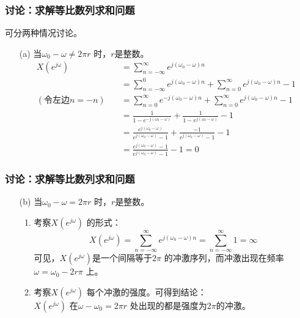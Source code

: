\documentclass[notheorems,compress,mathserif,table]{beamer}
\begin{document}
\begin{frame}[shrink]\frametitle{讨论：求解等比数列求和问题}%
可分两种情况讨论。
\begin{enumerate}

\item [(a)] 当$\omega_{0}-\omega\neq 2\pi r$ 时，$r$是整数。
\begin{equation*}
\begin{split}
X(e^{j\omega})
&= \sum_{n=-\infty}^{\infty}e^{j(\omega_{0}-\omega) n}\\
&= \sum_{n=-\infty}^{0}e^{j(\omega_{0}-\omega) n}+
\sum_{n=0}^{\infty}e^{j(\omega_{0}-\omega) n} -1\\
(\mbox{令左边}n=-n)\quad  &= \sum_{n=0}^{\infty}e^{-j(\omega_{0}-\omega) n}+
\sum_{n=0}^{\infty}e^{j(\omega_{0}-\omega) n} -1\\
&= \frac{1}{1-e^{-j(\omega_{0}-\omega) }}+ \frac{1}{1-e^{j(\omega_{0}-\omega) }}-1\\
&= \frac{e^{j(\omega_{0}-\omega) }}{e^{j(\omega_{0}-\omega) }-1}+
\frac{-1}{e^{j(\omega_{0}-\omega) }-1}-1\\
&= \frac{e^{j(\omega_{0}-\omega) }-1}{e^{j(\omega_{0}-\omega) }-1}-1 = 0
\end{split}
\end{equation*}
\end{enumerate}
\end{frame}





\begin{frame}[shrink]\frametitle{讨论：求解等比数列求和问题}%
\begin{enumerate}
\item [(b)] 当$\omega_{0}-\omega= 2\pi r$ 时，$r$是整数。

\begin{enumerate}
\item 考察$X(e^{j\omega})$ 的形式：
$$X(e^{j\omega})= \sum_{n=-\infty}^{\infty}e^{j(\omega_{0}-\omega) n}= \sum_{n=-\infty}^{\infty}1 = \infty$$
可见，$X(e^{j\omega})$是一个间隔等于$2\pi$ 的冲激序列，而冲激出现在频率
$\omega = \omega_{0}-2r\pi$ 上。
\item 考察$X(e^{j\omega})$ 每个冲激的强度。可得到结论：\\
$X(e^{j\omega})$ 在$\omega-\omega_{0}= 2\pi r$ 处出现的都是强度为$2\pi$的冲激。
\end{enumerate}
\end{enumerate}
\end{frame}
\end{document}
